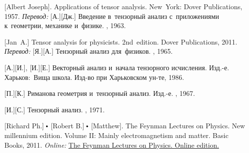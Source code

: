 \begin{thebibliography}{123}
\begin{otherlanguage}{russian}
[Albert Joseph]. Applications of tensor analysis. New~York: Dover Publications, 1957. 
\emph{Перевод:} [А.][Дж.] Введение в~тензорный анализ с~приложениями к~геометрии, механике и~физике. \fizmatgiz, 1963. 

[Jan~A.] Tensor analysis for physicists. 2nd~edition. Dover Publications, 2011. 
\emph{Перевод:} [Я.][А.] Тензорный анализ для~физиков. \naukapublisher, 1965. 

[А.][И.], [И.][Е.] Векторный анализ и~начала тензорного исчисления. Изд.\hbox{-}е. Харьков:~Вища школа. Изд\hbox{-}во при Харь\-ков\-ском ун\hbox{-}те, 1986. 

[П.][К.] Риманова геометрия и~тензорный анализ. Изд.\hbox{-}е. \naukapublisher, 1967. 

[И.][С.] Тензорный анализ. \naukapublisher, 1971. 

%
%




[Richard Ph.] ${\hspace{-0.2ex}\bigdot}$ [Robert B.] ${\hspace{-0.2ex}\bigdot}$ [Matthew]. The Feynman Lectures on Physics. New millennium edition. Volume II: Mainly electromagnetism and matter. Basic Books, 2011. 
\emph{Online:}
\href{http://www.feynmanlectures.caltech.edu/}{The Feynman Lectures on Physics. Online edition.}


\end{otherlanguage}
\end{thebibliography}
